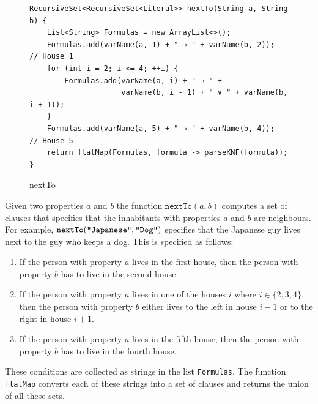 \begin{figure}[!ht]
\centering
\begin{verbatim}
RecursiveSet<RecursiveSet<Literal>> nextTo(String a, String b) {
    List<String> Formulas = new ArrayList<>();
    Formulas.add(varName(a, 1) + " → " + varName(b, 2));      // House 1
    for (int i = 2; i <= 4; ++i) {
        Formulas.add(varName(a, i) + " → " +
                     varName(b, i - 1) + " ∨ " + varName(b, i + 1));
    }
    Formulas.add(varName(a, 5) + " → " + varName(b, 4));      // House 5
    return flatMap(Formulas, formula -> parseKNF(formula));
}
\end{verbatim}
\vspace*{-0.3cm}
\caption{nextTo} %
\label{fig:nextTo}
\end{figure}
Given two properties $a$ and $b$ the function $\texttt{nextTo}(a, b)$ computes a
set of clauses that specifies that the inhabitants with properties $a$ and $b$
are neighbours.  For example, $\texttt{nextTo}(\texttt{\symbol{34}Japanese\symbol{34}}, \texttt{\symbol{34}Dog\symbol{34}})$
specifies that the Japanese guy lives next to the guy who keeps a dog. 
This is specified as follows:
\begin{enumerate}
\item If the person with property $a$ lives in the first house, then the person with property $b$ has to live
      in the second house.
\item If the person with property $a$ lives in one of the houses $i$ where $i \in \{ 2, 3, 4 \}$, then
      the person with property $b$ either lives to the left in house $i-1$ or to the right in house $i+1$.
\item If the person with property $a$ lives in the fifth house, then the person with property $b$ has to live
      in the fourth house.
\end{enumerate}
These conditions are collected as strings in the list \texttt{Formulas}.  The function \texttt{flatMap} converts
each of these strings into a set of clauses and returns the union of all these sets.

